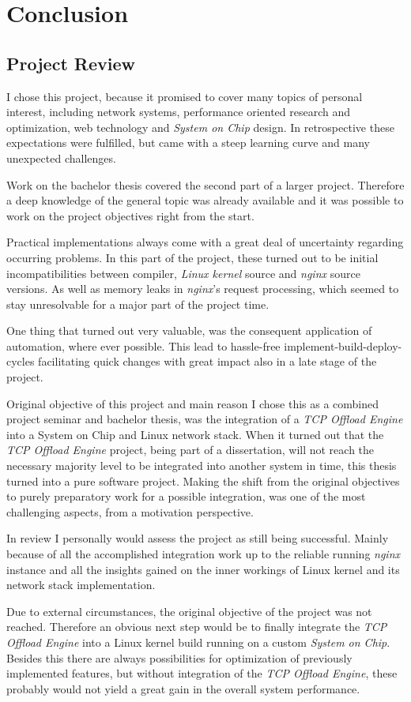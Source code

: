 \chapter{Conclusion}

\section{Project Review}

I chose this project, because it promised to cover many topics of personal interest, including network systems, performance oriented research and optimization, web technology and \textit{System on Chip} design. In retrospective these expectations were fulfilled, but came with a steep learning curve and many unexpected challenges.

Work on the bachelor thesis covered the second part of a larger project. Therefore a deep knowledge of the general topic was already available and it was possible to work on the project objectives right from the start.

Practical implementations always come with a great deal of uncertainty regarding occurring problems. In this part of the project, these turned out to be initial incompatibilities between compiler, \textit{Linux kernel} source and \textit{nginx} source versions. As well as memory leaks in \textit{nginx}'s request processing, which seemed to stay unresolvable for a major part of the project time.

One thing that turned out very valuable, was the consequent application of automation, where ever possible. This lead to hassle-free implement-build-deploy-cycles facilitating quick changes with great impact also in a late stage of the project.

Original objective of this project and main reason I chose this as a combined project seminar and bachelor thesis, was the integration of a \textit{TCP Offload Engine} into a System on Chip and Linux network stack. When it turned out that the \textit{TCP Offload Engine} project, being part of a dissertation, will not reach the necessary majority level to be integrated into another system in time, this thesis turned into a pure software project. Making the shift from the original objectives to purely preparatory work for a possible integration, was one of the most challenging aspects, from a motivation perspective. 

In review I personally would assess the project as still being successful. Mainly because of all the accomplished integration work up to the reliable running \textit{nginx} instance and all the insights gained on the inner workings of Linux kernel and its network stack implementation.

Due to external circumstances, the original objective of the project was not reached. Therefore an obvious next step would be to finally integrate the \textit{TCP Offload Engine} into a Linux kernel build running on a custom \textit{System on Chip}. Besides this there are always possibilities for optimization of previously implemented features, but without integration of the \textit{TCP Offload Engine}, these probably would not yield a great gain in the overall system performance.